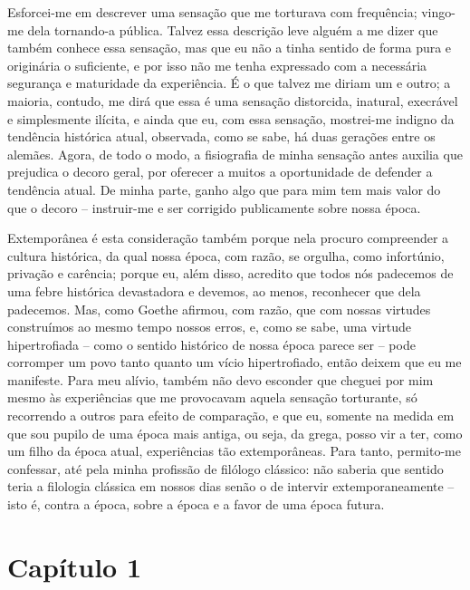 Esforcei-me em descrever uma sensação que me torturava com frequência;
vingo-me dela tornando-a pública. Talvez essa descrição leve alguém a me
dizer que também conhece essa sensação, mas que eu não a tinha sentido
de forma pura e originária o suficiente, e por isso não me tenha
expressado com a necessária segurança e maturidade da experiência. É o
que talvez me diriam um e outro; a maioria, contudo, me dirá que essa é
uma sensação distorcida, inatural, execrável e simplesmente ilícita, e
ainda que eu, com essa sensação, mostrei-me indigno da tendência
histórica atual, observada, como se sabe, há duas gerações entre os
alemães. Agora, de todo o modo, a fisiografia de minha sensação antes
auxilia que prejudica o decoro geral, por oferecer a muitos a
oportunidade de defender a tendência atual. De minha parte, ganho algo
que para mim tem mais valor do que o decoro -- instruir-me e ser
corrigido publicamente sobre nossa época.

Extemporânea é esta consideração também porque nela procuro compreender
a cultura histórica, da qual nossa época, com razão, se orgulha, como
infortúnio, privação e carência; porque eu, além disso, acredito que
todos nós padecemos de uma febre histórica devastadora e devemos, ao
menos, reconhecer que dela padecemos. Mas, como Goethe afirmou, com
razão, que com nossas virtudes construímos ao mesmo tempo nossos erros,
e, como se sabe, uma virtude hipertrofiada -- como o sentido histórico
de nossa época parece ser -- pode corromper um povo tanto quanto um
vício hipertrofiado, então deixem que eu me manifeste. Para meu alívio,
também não devo esconder que cheguei por mim mesmo às experiências que
me provocavam aquela sensação torturante, só recorrendo a outros para
efeito de comparação, e que eu, somente na medida em que sou pupilo de
uma época mais antiga, ou seja, da grega, posso vir a ter, como um filho
da época atual, experiências tão extemporâneas. Para tanto, permito-me
confessar, até pela minha profissão de filólogo clássico: não saberia
que sentido teria a filologia clássica em nossos dias senão o de
intervir extemporaneamente -- isto é, contra a época, sobre a época e a
favor de uma época futura.

\chapter{Capítulo 1}

